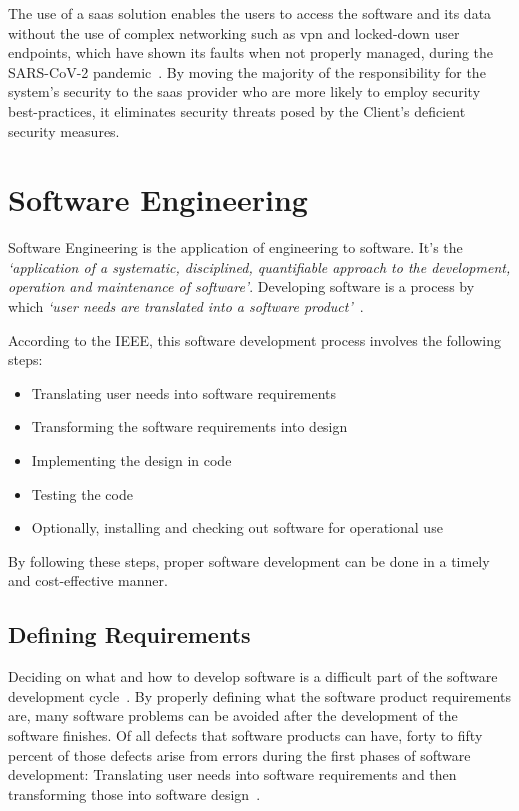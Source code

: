 The use of a \gls{saas} solution enables the users to access the software and its data without the use of complex networking such as \gls{vpn} and locked-down user endpoints, which have shown its faults when not properly managed, during the SARS-CoV-2 pandemic~\Parencite{adams_al_shahery_chmiel_cunliffe_day_fay_gardner_giuliani_goddard_karl_2022}. By moving the majority of the responsibility for the system's security to the \gls{saas} provider who are more likely to employ security best-practices, it eliminates security threats posed by the Client's deficient security measures.




\section{Software Engineering}\label{state-of-the-art:s:software-engineering}

Software Engineering is the application of engineering to software. It's the \textit{`application of a systematic, disciplined, quantifiable approach to the development, operation and maintenance of software'}. Developing software is a process by which \textit{`user needs are translated into a software product'}~\Parencite{8016712}.

According to the IEEE, this software development process involves the following steps:

\begin{itemize}

    \item Translating user needs into software requirements
    \item Transforming the software requirements into design
    \item Implementing the design in code
    \item Testing the code
    \item Optionally, installing and checking out software for operational use   
\end{itemize}

By following these steps, proper software development can be done in a timely and cost-effective manner.

\subsection{Defining Requirements}\label{state-of-the-art:ss:defining-requirements}

Deciding on what and how to develop software is a difficult part of the software development cycle~\Parencite{pacheco_garcía_reyes_2018}.
By properly defining what the software product requirements are, many software problems can be avoided after the development of the software finishes. Of all defects that software products can have, forty to fifty percent of those defects arise from errors during the first phases of software development: Translating user needs into software requirements and then transforming those into software design~\Parencite{eugene_wiegers_beatty_2013}. 

